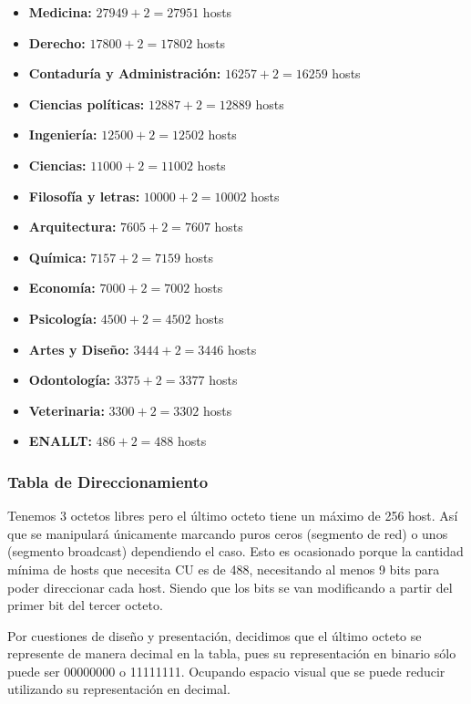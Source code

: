 \begin{itemize}[leftmargin=*]
    \item \textbf{Medicina:} $27949 + 2 = 27951$ hosts
    \item \textbf{Derecho:} $17800 + 2 = 17802$ hosts
    \item \textbf{Contaduría y Administración:} $16257 + 2 = 16259$ hosts
    \item \textbf{Ciencias políticas:} $12887 + 2 = 12889$ hosts
    \item \textbf{Ingeniería:} $12500 + 2 = 12502$ hosts
    \item \textbf{Ciencias:} $11000 + 2 = 11002$ hosts
    \item \textbf{Filosofía y letras:} $10000 + 2 = 10002$ hosts
    \item \textbf{Arquitectura:} $7605 + 2 = 7607$ hosts
    \item \textbf{Química:} $7157 + 2 = 7159$ hosts
    \item \textbf{Economía:} $7000 + 2 = 7002$ hosts
    \item \textbf{Psicología:} $4500 + 2 = 4502$ hosts
    \item \textbf{Artes y Diseño:} $3444 + 2 = 3446$ hosts
    \item \textbf{Odontología:} $3375 + 2 = 3377$ hosts
    \item \textbf{Veterinaria:} $3300 + 2 = 3302$ hosts
    \item \textbf{ENALLT:} $486 + 2 = 488$ hosts
\end{itemize}

\subsubsection*{Tabla de Direccionamiento}
Tenemos 3 octetos libres pero el último octeto tiene un máximo de 256 host. Así que se manipulará únicamente marcando puros ceros (segmento de red) o unos (segmento broadcast) dependiendo el caso. Esto es ocasionado porque la cantidad mínima de hosts que necesita CU es de 488, necesitando al menos 9 bits para poder direccionar cada host. Siendo que los bits se van modificando a partir del primer bit del tercer octeto.

Por cuestiones de diseño y presentación, decidimos que el último octeto se represente de manera decimal en la tabla, pues su representación en binario sólo puede ser 00000000 o 11111111. Ocupando espacio visual que se puede reducir utilizando su representación en decimal. 

